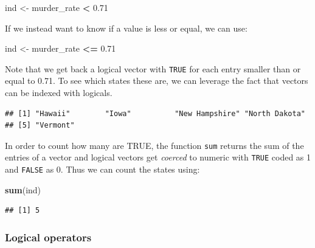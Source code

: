 \documentclass[
]{article}
\newenvironment{Shaded}{\begin{snugshade}}{\end{snugshade}}
\newcommand{\FloatTok}[1]{\textcolor[rgb]{0.00,0.00,0.81}{#1}}
\newcommand{\FunctionTok}[1]{\textcolor[rgb]{0.13,0.29,0.53}{\textbf{#1}}}
\newcommand{\NormalTok}[1]{#1}
\newcommand{\OtherTok}[1]{\textcolor[rgb]{0.56,0.35,0.01}{#1}}
\newcommand{\SpecialCharTok}[1]{\textcolor[rgb]{0.81,0.36,0.00}{\textbf{#1}}}
\begin{document}
\begin{Shaded}
\begin{Highlighting}[]
\NormalTok{ind }\OtherTok{\textless{}{-}}\NormalTok{ murder\_rate }\SpecialCharTok{\textless{}} \FloatTok{0.71}
\end{Highlighting}
\end{Shaded}

If we instead want to know if a value is less or equal, we can use:

\begin{Shaded}
\begin{Highlighting}[]
\NormalTok{ind }\OtherTok{\textless{}{-}}\NormalTok{ murder\_rate }\SpecialCharTok{\textless{}=} \FloatTok{0.71}
\end{Highlighting}
\end{Shaded}

Note that we get back a logical vector with \texttt{TRUE} for each entry
smaller than or equal to 0.71. To see which states these are, we can
leverage the fact that vectors can be indexed with logicals.

\begin{Shaded}
\end{Shaded}

\begin{verbatim}
## [1] "Hawaii"        "Iowa"          "New Hampshire" "North Dakota" 
## [5] "Vermont"
\end{verbatim}

In order to count how many are TRUE, the function \texttt{sum} returns
the sum of the entries of a vector and logical vectors get
\emph{coerced} to numeric with \texttt{TRUE} coded as 1 and
\texttt{FALSE} as 0. Thus we can count the states using:

\begin{Shaded}
\begin{Highlighting}[]
\FunctionTok{sum}\NormalTok{(ind)}
\end{Highlighting}
\end{Shaded}

\begin{verbatim}
## [1] 5
\end{verbatim}

\subsubsection{Logical operators}\label{logical-operators}
\end{document}
